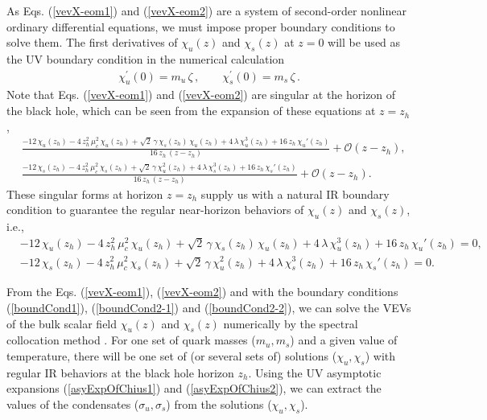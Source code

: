 \documentclass[11pt,a4paper,psfrag]{article}
\begin{document}
As Eqs. (\ref{vevX-eom1}) and (\ref{vevX-eom2}) are a system of second-order nonlinear ordinary differential equations, we must impose proper boundary conditions to solve them. The first derivatives of $\chi_u(z)$ and $\chi_s(z)$ at $z=0$ will be used as the UV boundary condition in the numerical calculation
\begin{align}\label{boundCond1}
\chi_u^{\prime}(0) =m_u\,\zeta \,, \qquad  \chi_s^{\prime}(0) =m_s\,\zeta \,.
\end{align}
Note that Eqs. (\ref{vevX-eom1}) and (\ref{vevX-eom2}) are singular at the horizon of the black hole, which can be seen from the expansion of these equations at $z=z_h$,
\begin{align}
&\frac{-12\,\chi_u(z_h)-4\,z_h^2\,\mu_c^2\,\chi_u(z_h)+\sqrt{2}\,\gamma\,\chi_s(z_h)\,\chi_u(z_h)+4\,\lambda\,\chi_u^3(z_h)
+16\,z_h\,\chi_u'(z_h)}{16\,z_h\,(z-z_h)}+\mathcal{O}(z-z_h),\\
&\frac{-12\,\chi_s(z_h)-4\,z_h^2\,\mu_c^2\,\chi_s(z_h)+\sqrt{2}\,\gamma\,\chi_u^2(z_h)+4\,\lambda\,\chi_s^3(z_h)
+16\,z_h\,\chi_s'(z_h)}{16\,z_h\,(z-z_h)}+\mathcal{O}(z-z_h).
\end{align}
These singular forms at horizon $z=z_h$ supply us with a natural IR boundary condition to guarantee the regular near-horizon behaviors of $\chi_u(z)$ and $\chi_s(z)$, i.e.,
\begin{align}
& -12\,\chi_u(z_h)-4\,z_h^2\,\mu_c^2\,\chi_u(z_h)+\sqrt{2}\,\gamma\,\chi_s(z_h)\,\chi_u(z_h)+4\,\lambda\,\chi_u^3(z_h)+16\,z_h\,\chi_u'(z_h) =0, \label{boundCond2-1} \\
& -12\,\chi_s(z_h)-4\,z_h^2\,\mu_c^2\,\chi_s(z_h)+\sqrt{2}\,\gamma\,\chi_u^2(z_h)+4\,\lambda\,\chi_s^3(z_h)+16\,z_h\,\chi_s'(z_h) =0. \label{boundCond2-2}
\end{align}

From the Eqs. (\ref{vevX-eom1}), (\ref{vevX-eom2}) and with the boundary conditions (\ref{boundCond1}), (\ref{boundCond2-1}) and (\ref{boundCond2-2}), we can solve the VEVs of the bulk scalar field $\chi_u(z)$ and $\chi_s(z)$ numerically by the spectral collocation method \cite{Shen:2011,Yin:2013}. For one set of quark masses ($m_{u}, m_s$) and a given value of temperature, there will be one set of (or several sets of) solutions ($\chi_{u},\chi_{s}$) with regular IR behaviors at the black hole horizon $z_{h}$. Using the UV asymptotic expansions (\ref{asyExpOfChius1}) and (\ref{asyExpOfChius2}), we can extract the values of the condensates ($\sigma_{u},\sigma_{s}$) from the solutions ($\chi_{u},\chi_{s}$).
\end{document}

